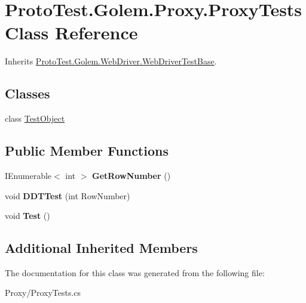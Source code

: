 \hypertarget{class_proto_test_1_1_golem_1_1_proxy_1_1_proxy_tests}{\section{Proto\-Test.\-Golem.\-Proxy.\-Proxy\-Tests Class Reference}
\label{class_proto_test_1_1_golem_1_1_proxy_1_1_proxy_tests}
}


Inherits \hyperlink{class_proto_test_1_1_golem_1_1_web_driver_1_1_web_driver_test_base}{Proto\-Test.\-Golem.\-Web\-Driver.\-Web\-Driver\-Test\-Base}.

\subsection*{Classes}
\begin{DoxyCompactItemize}
\item 
class \hyperlink{class_proto_test_1_1_golem_1_1_proxy_1_1_proxy_tests_1_1_test_object}{Test\-Object}
\end{DoxyCompactItemize}
\subsection*{Public Member Functions}
\begin{DoxyCompactItemize}
\item 
\hypertarget{class_proto_test_1_1_golem_1_1_proxy_1_1_proxy_tests_a29fe06a755a9ad57f84f69d06316c0f0}{I\-Enumerable$<$ int $>$ {\bfseries Get\-Row\-Number} ()}\label{class_proto_test_1_1_golem_1_1_proxy_1_1_proxy_tests_a29fe06a755a9ad57f84f69d06316c0f0}

\item 
\hypertarget{class_proto_test_1_1_golem_1_1_proxy_1_1_proxy_tests_ab89a43637ef864e58250dd8d83246548}{void {\bfseries D\-D\-T\-Test} (int Row\-Number)}\label{class_proto_test_1_1_golem_1_1_proxy_1_1_proxy_tests_ab89a43637ef864e58250dd8d83246548}

\item 
\hypertarget{class_proto_test_1_1_golem_1_1_proxy_1_1_proxy_tests_a2b55736d51232fd8b8a84150bd71af56}{void {\bfseries Test} ()}\label{class_proto_test_1_1_golem_1_1_proxy_1_1_proxy_tests_a2b55736d51232fd8b8a84150bd71af56}

\end{DoxyCompactItemize}
\subsection*{Additional Inherited Members}


The documentation for this class was generated from the following file\-:\begin{DoxyCompactItemize}
\item 
Proxy/Proxy\-Tests.\-cs\end{DoxyCompactItemize}
